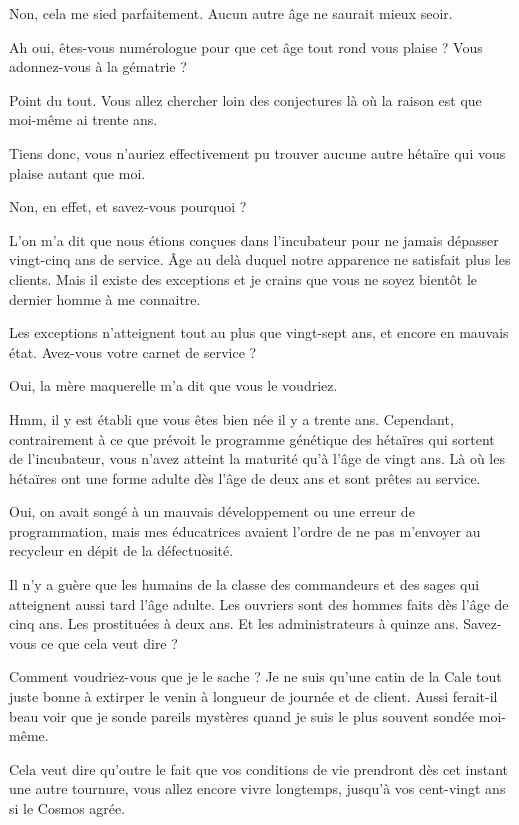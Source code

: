 \begin{drama}
  \elenaspeaks Non, cela me sied parfaitement. Aucun autre âge ne saurait mieux seoir.

  \elaspeaks Ah oui, êtes-vous numérologue pour que cet âge tout rond vous plaise ? Vous adonnez-vous à la gématrie ?

  \elenaspeaks {} Point du tout. Vous allez chercher loin des conjectures là où la raison est que moi-même ai trente ans.

  \elaspeaks Tiens donc, vous n’auriez effectivement pu trouver aucune autre hétaïre qui vous plaise autant que moi.

  \elenaspeaks Non, en effet, et savez-vous pourquoi ?

  \elaspeaks L’on m’a dit que nous étions conçues dans l’incubateur pour ne jamais dépasser vingt-cinq ans de service. Âge au delà duquel notre apparence ne satisfait plus les clients. Mais il existe des exceptions et je crains que vous ne soyez bientôt le dernier homme à me connaitre.

  \elenaspeaks Les exceptions n’atteignent tout au plus que vingt-sept ans, et encore en mauvais état. Avez-vous votre carnet de service ?

  \elaspeaks Oui, la mère maquerelle m’a dit que vous le voudriez.

  \elenaspeaks {} Hmm, il y est établi que vous êtes bien née il y a trente ans. Cependant, contrairement à ce que prévoit le programme génétique des hétaïres qui sortent de l’incubateur, vous n’avez atteint la maturité qu’à l’âge de vingt ans. Là où les hétaïres ont une forme adulte dès l’âge de deux ans et sont prêtes au service.

  \elaspeaks Oui, on avait songé à un mauvais développement ou une erreur de programmation, mais mes éducatrices avaient l’ordre de ne pas m’envoyer au recycleur en dépit de la défectuosité.

  \elenaspeaks Il n’y a guère que les humains de la classe des commandeurs et des sages qui atteignent aussi tard l’âge adulte. Les ouvriers sont des hommes faits dès l’âge de cinq ans. Les prostituées à deux ans. Et les administrateurs à quinze ans. Savez-vous ce que cela veut dire ?

  \elaspeaks Comment voudriez-vous que je le sache ? Je ne suis qu’une catin de la Cale tout juste bonne à extirper le venin à longueur de journée et de client. Aussi ferait-il beau voir que je sonde pareils mystères quand je suis le plus souvent sondée moi-même.

  \elenaspeaks Cela veut dire qu’outre le fait que vos conditions de vie prendront dès cet instant une autre tournure, vous allez encore vivre longtemps, jusqu’à vos cent-vingt ans si le Cosmos agrée.

\end{drama}


